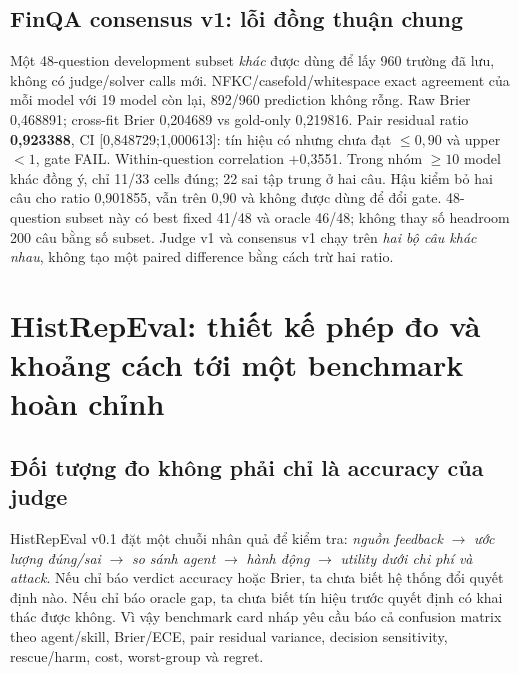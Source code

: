 \documentclass[11pt,a4paper,openany]{book}
\newcommand{\repo}[1]{\path{#1}}
\begin{document}
\section{FinQA consensus v1: lỗi đồng thuận chung}
Một 48-question development subset \emph{khác} được dùng để lấy 960 trường \repo{prediction} đã lưu, không có judge/solver calls mới. NFKC/casefold/whitespace exact agreement của mỗi model với 19 model còn lại, 892/960 prediction không rỗng. Raw Brier 0,468891; cross-fit Brier 0,204689 vs gold-only 0,219816. Pair residual ratio \textbf{0,923388}, CI [0,848729;1,000613]: tín hiệu có nhưng chưa đạt \(\le0,90\) và upper \(<1\), gate FAIL. Within-question correlation +0,3551. Trong nhóm \(\ge10\) model khác đồng ý, chỉ 11/33 cells đúng; 22 sai tập trung ở hai câu. Hậu kiểm bỏ hai câu cho ratio 0,901855, vẫn trên 0,90 và không được dùng để đổi gate. 48-question subset này có best fixed 41/48 và oracle 46/48; không thay số headroom 200 câu bằng số subset. Judge v1 và consensus v1 chạy trên \emph{hai bộ câu khác nhau}, không tạo một paired difference bằng cách trừ hai ratio.

\chapter{HistRepEval: thiết kế phép đo và khoảng cách tới một benchmark hoàn chỉnh}
\section{Đối tượng đo không phải chỉ là accuracy của judge}
HistRepEval v0.1 đặt một chuỗi nhân quả để kiểm tra: \emph{nguồn feedback} \(\to\) \emph{ước lượng đúng/sai} \(\to\) \emph{so sánh agent} \(\to\) \emph{hành động} \(\to\) \emph{utility dưới chi phí và attack}. Nếu chỉ báo verdict accuracy hoặc Brier, ta chưa biết hệ thống đổi quyết định nào. Nếu chỉ báo oracle gap, ta chưa biết tín hiệu trước quyết định có khai thác được không. Vì vậy benchmark card nháp yêu cầu báo cả confusion matrix theo agent/skill, Brier/ECE, pair residual variance, decision sensitivity, rescue/harm, cost, worst-group và regret.
\end{document}
